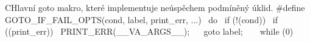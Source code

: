 \begin{code}{C}{Hlavní goto makro, které implementuje neúspěchem podmíněný úklid.}
#define GOTO_IF_FAIL_OPTS(cond, label, print_err, ...)  \
  do {                                                  \
    if (!(cond)) {                                      \
      if ((print_err)) {                                \
        PRINT_ERR(__VA_ARGS__);                         \
      }                                                 \
      goto label;                                       \
    }                                                   \
  } while (0)
\end{code}
